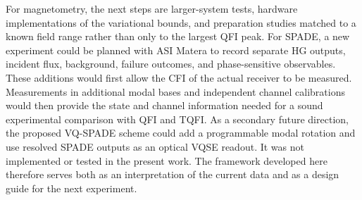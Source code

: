 For magnetometry, the next steps are larger-system tests, hardware implementations of the variational bounds, and preparation studies matched to a known field range rather than only to the largest QFI peak.  For SPADE, a new experiment could be planned with ASI Matera to record separate HG outputs, incident flux, background, failure outcomes, and phase-sensitive observables.  These additions would first allow the CFI of the actual receiver to be measured.  Measurements in additional modal bases and independent channel calibrations would then provide the state and channel information needed for a sound experimental comparison with QFI and TQFI.  As a secondary future direction, the proposed VQ-SPADE scheme could add a programmable modal rotation and use resolved SPADE outputs as an optical VQSE readout.  It was not implemented or tested in the present work.  The framework developed here therefore serves both as an interpretation of the current data and as a design guide for the next experiment.
